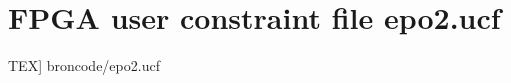 \chapter[User constraint file]{FPGA user constraint file epo2.ucf}\label{appdix:ucf} 
	\scriptsize
	 TEX] {broncode/epo2.ucf}
	\normalsize
